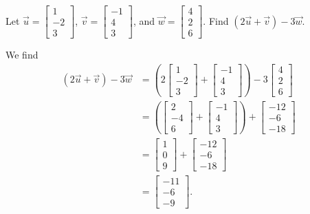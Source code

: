 \begin{example}
	Let $\vec{u} = \begin{bmatrix} 1 \\ -2 \\ 3 \end{bmatrix}$,
	$\vec{v} = \begin{bmatrix} -1 \\ 4 \\ 3 \end{bmatrix}$, and
	$\vec{w} = \begin{bmatrix} 4 \\ 2 \\ 6 \end{bmatrix}$.
	Find $(2\vec{u} + \vec{v}) - 3\vec{w}$.
\end{example}
\begin{answer}
	We find
	\begin{align*}
		(2\vec{u} + \vec{v}) - 3\vec{w} &= \left(2\begin{bmatrix} 1 \\ -2 \\ 3 \end{bmatrix} + \begin{bmatrix} -1 \\ 4 \\ 3 \end{bmatrix}\right) - 3\begin{bmatrix} 4 \\ 2 \\ 6 \end{bmatrix} \\
		&= \left(\begin{bmatrix}2 \\ -4 \\ 6\end{bmatrix} + \begin{bmatrix} -1 \\ 4 \\ 3 \end{bmatrix}\right) + \begin{bmatrix}-12 \\ -6 \\ -18\end{bmatrix} \\
		&= \begin{bmatrix}1 \\ 0 \\ 9\end{bmatrix} + \begin{bmatrix}-12 \\ -6 \\ -18\end{bmatrix} \\
		&= \begin{bmatrix}-11 \\ -6 \\ -9\end{bmatrix}.
	\end{align*}
\end{answer}

